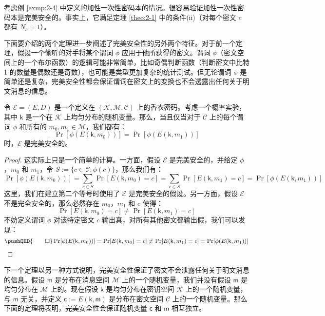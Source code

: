 \begin{example}
考虑例 \ref{exmp:2-4} 中定义的加性一次性密码本的情况。很容易验证加性一次性密码本是完美安全的。事实上，它满足定理 \ref{theo:2-1} 中的条件(ii)（对每个密文 $c$ 都有 $N_c=1$）。
\end{example}


下面要介绍的两个定理进一步阐述了完美安全性的另外两个特征。对于前一个定理，假设一个偷听的对手将某个谓词 $\phi$ 应用于他所获得的密文。谓词 $\phi$（密文空间上的一个布尔函数）的逻辑可能非常简单，比如奇偶判断函数（判断密文中比特 1 的数量是偶数还是奇数），也可能是类型更加复杂的统计测试。但无论谓词 $\phi$ 是简单还是复杂，完美安全性都会保证谓词在密文上的变换也不会透露出任何关于明文消息的信息。

\begin{theorem}\label{theo:2-3}
令 $\mathcal{E}=(E,D)$ 是一个定义在 $(\mathcal{K},\mathcal{M},\mathcal{C})$ 上的香农密码。考虑一个概率实验，其中 $\mathsf{k}$ 是一个在 $\mathcal{K}$ 上均匀分布的随机变量。那么，当且仅当对于 $\mathcal{C}$ 上的每个谓词 $\phi$ 和所有的 $m_0,m_1\in\mathcal{M}$，我们都有：
$$
\Pr[\phi(E(\mathsf{k},m_0))]=
\Pr[\phi(E(\mathsf{k}, m_1))]
$$
时，$\mathcal{E}$ 是完美安全的。
\end{theorem}

\begin{proof}
这实际上只是一个简单的计算。一方面，假设 $\mathcal{E}$ 是完美安全的，并给定 $\phi$，$m_0$ 和 $m_1$，令 $S:=\{c\in\mathcal{C}:\phi(c)\}$，那么我们有：
$$
\Pr[\phi(E(\mathsf{k}, m_0))]=\sum_{c\in S}\Pr[E(\mathsf{k}, m_0) = c]=\sum_{c\in S}\Pr[E(\mathsf{k}, m_1) = c]=\Pr[\phi(E(\mathsf{k}, m_1) )]
$$
这里，我们在建立第二个等号时使用了 $\mathcal{E}$ 是完美安全的假设。另一方面，假设 $\mathcal{E}$ 不是完全安全的，那么必然存在 $m_0$，$m_1$ 和 $c$ 使得：
$$
\Pr[E(\mathsf{k},m_0)=c]\neq
\Pr[E(\mathsf{k},m_1)=c]
$$
不妨定义谓词 $\phi$ 对该特定密文 $c$ 输出真，对所有其他密文都输出假，我们可以发现：
\[
\pushQED{\qed}
\Pr[\phi(E(\mathsf{k}, m_0))]= 
\Pr[E(\mathsf{k}, m_0) = c]\neq
\Pr[E(\mathsf{k}, m_1) = c]=
\Pr[\phi(E(\mathsf{k}, m_1))]\qedhere
\]
\end{proof}

下一个定理以另一种方式说明，完美安全性保证了密文不会泄露任何关于明文消息的信息。假设 $\mathsf{m}$ 是分布在消息空间 $\mathcal{M}$ 上的一个随机变量，我们并没有假设 $\mathsf{m}$ 是均匀分布在 $\mathcal{M}$ 上的。现在假设 $\mathsf{k}$ 是均匀分布在密钥空间 $\mathcal{K}$ 上的一个随机变量，与 $\mathsf{m}$ 无关，并定义 $\mathsf{c}:=E(\mathsf{k},\mathsf{m})$ 是分布在密文空间 $\mathcal{C}$ 上的一个随机变量。那么下面的定理将表明，完美安全性会保证随机变量 $\mathsf{c}$ 和 $\mathsf{m}$ 相互独立。

